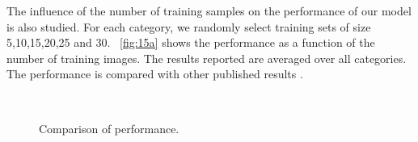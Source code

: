 \documentclass[twocolumn]{article}
\begin{document}
The influence of the number of training samples on the performance of our model is also studied.
For each category, we randomly select training sets of size 5,10,15,20,25 and 30.
\figurename~\ref{fig:15a} shows the performance as a function of the number of training images.
The results reported are averaged over all categories.
The performance is compared with other published results \cite{grauman2005,lazebnik2006,zhang2006,wang2006,bosch2007,boiman2008,liu2013,heo2014}.

\begin{figure}
\centering
  \\
\caption{Comparison of performance.}
\label{fig:15}
\end{figure}
\end{document}
